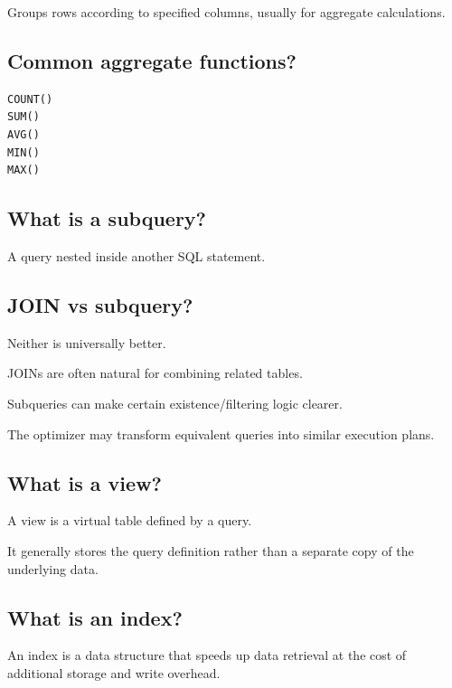 Groups rows according to specified columns, usually for aggregate calculations.

\medskip

\subsection{Common aggregate functions?}

\begin{lstlisting}
COUNT()
SUM()
AVG()
MIN()
MAX()
\end{lstlisting}

\medskip

\subsection{What is a subquery?}

A query nested inside another SQL statement.

\medskip

\subsection{JOIN vs subquery?}

Neither is universally better.

JOINs are often natural for combining related tables.

Subqueries can make certain existence/filtering logic clearer.

The optimizer may transform equivalent queries into similar execution plans.

\medskip

\subsection{What is a view?}

A view is a virtual table defined by a query.

It generally stores the query definition rather than a separate copy of the underlying data.

\medskip

\subsection{What is an index?}

An index is a data structure that speeds up data retrieval at the cost of additional storage and write overhead.

\medskip

